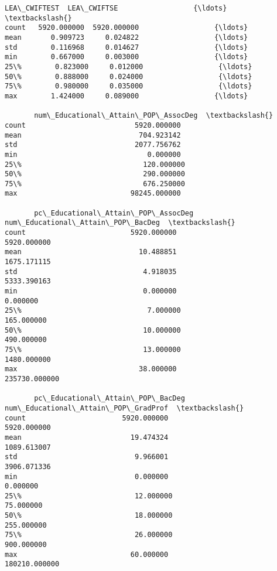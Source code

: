 \documentclass[11pt]{article}
\begin{document}
\begin{Verbatim}[commandchars=\\\{\}]
       LEA\_CWIFTEST  LEA\_CWIFTSE                  {\ldots}                   \textbackslash{}
count   5920.000000  5920.000000                  {\ldots}                    
mean       0.909723     0.024822                  {\ldots}                    
std        0.116968     0.014627                  {\ldots}                    
min        0.667000     0.003000                  {\ldots}                    
25\%        0.823000     0.012000                  {\ldots}                    
50\%        0.888000     0.024000                  {\ldots}                    
75\%        0.980000     0.035000                  {\ldots}                    
max        1.424000     0.089000                  {\ldots}                    

       num\_Educational\_Attain\_POP\_AssocDeg  \textbackslash{}
count                          5920.000000   
mean                            704.923142   
std                            2077.756762   
min                               0.000000   
25\%                             120.000000   
50\%                             290.000000   
75\%                             676.250000   
max                           98245.000000   

       pc\_Educational\_Attain\_POP\_AssocDeg  num\_Educational\_Attain\_POP\_BacDeg  \textbackslash{}
count                         5920.000000                        5920.000000   
mean                            10.488851                        1675.171115   
std                              4.918035                        5333.390163   
min                              0.000000                           0.000000   
25\%                              7.000000                         165.000000   
50\%                             10.000000                         490.000000   
75\%                             13.000000                        1480.000000   
max                             38.000000                      235730.000000   

       pc\_Educational\_Attain\_POP\_BacDeg  num\_Educational\_Attain\_POP\_GradProf  \textbackslash{}
count                       5920.000000                          5920.000000   
mean                          19.474324                          1089.613007   
std                            9.966001                          3906.071336   
min                            0.000000                             0.000000   
25\%                           12.000000                            75.000000   
50\%                           18.000000                           255.000000   
75\%                           26.000000                           900.000000   
max                           60.000000                        180210.000000   


\end{Verbatim}
\end{document}
